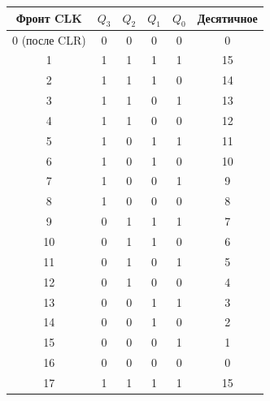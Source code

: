\begin{tabular}{c|cccc|c}
\toprule
Фронт CLK & $Q_3$ & $Q_2$ & $Q_1$ & $Q_0$ & Десятичное \\
\midrule
0 (после CLR) & 0 & 0 & 0 & 0 & 0 \\
1 & 1 & 1 & 1 & 1 & 15 \\
2 & 1 & 1 & 1 & 0 & 14 \\
3 & 1 & 1 & 0 & 1 & 13 \\
4 & 1 & 1 & 0 & 0 & 12 \\
5 & 1 & 0 & 1 & 1 & 11 \\
6 & 1 & 0 & 1 & 0 & 10 \\
7 & 1 & 0 & 0 & 1 & 9 \\
8 & 1 & 0 & 0 & 0 & 8 \\
9 & 0 & 1 & 1 & 1 & 7 \\
10 & 0 & 1 & 1 & 0 & 6 \\
11 & 0 & 1 & 0 & 1 & 5 \\
12 & 0 & 1 & 0 & 0 & 4 \\
13 & 0 & 0 & 1 & 1 & 3 \\
14 & 0 & 0 & 1 & 0 & 2 \\
15 & 0 & 0 & 0 & 1 & 1 \\
16 & 0 & 0 & 0 & 0 & 0 \\
17 & 1 & 1 & 1 & 1 & 15 \\
\bottomrule
\end{tabular}